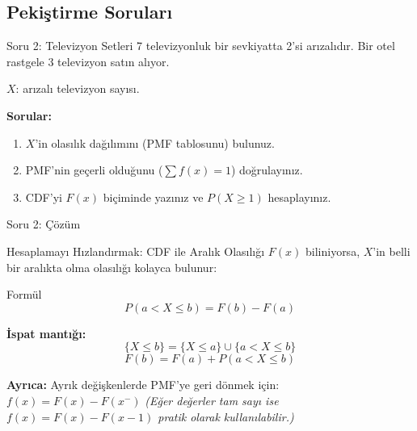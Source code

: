 \documentclass[light]{lutbeamer}
\begin{document}
\subsection{Pekiştirme Soruları}

\begin{frame}{Soru 2: Televizyon Setleri}
    7 televizyonluk bir sevkiyatta 2'si arızalıdır. Bir otel rastgele 3 televizyon satın alıyor.

    $X$: arızalı televizyon sayısı.

    \textbf{Sorular:}
    \begin{enumerate}
        \item[(a)] $X$'in olasılık dağılımını (PMF tablosunu) bulunuz.
        \item[(b)] PMF'nin geçerli olduğunu ($\sum f(x) = 1$) doğrulayınız.
        \item[(c)] CDF'yi $F(x)$ biçiminde yazınız ve $P(X \ge 1)$ hesaplayınız.
    \end{enumerate}
\end{frame}

\begin{frame}{Soru 2: Çözüm}
\end{frame}



\begin{frame}{Hesaplamayı Hızlandırmak: CDF ile Aralık Olasılığı}
    $F(x)$ biliniyorsa, $X$'in belli bir aralıkta olma olasılığı kolayca bulunur:

    \begin{block}{Formül}
        \[
        P(a < X \le b) = F(b) - F(a)
        \]
    \end{block}

    \textbf{İspat mantığı:}
    \[
    \{X \le b\} = \{X \le a\} \cup \{a < X \le b\}
    \]
    \[
    F(b) = F(a) + P(a < X \le b)
    \]

    \textbf{Ayrıca:} Ayrık değişkenlerde PMF'ye geri dönmek için:
    $f(x) = F(x) - F(x^{-})$
    \scriptsize \textit{(Eğer değerler tam sayı ise $f(x)=F(x)-F(x-1)$ pratik olarak kullanılabilir.)}
\end{frame}
\end{document}
